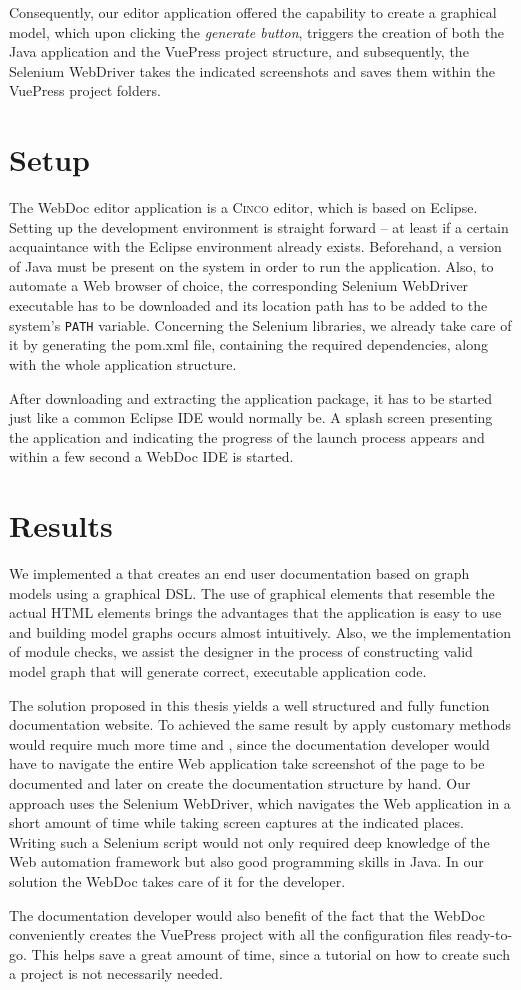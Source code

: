 Consequently, our editor application offered the capability to create a graphical model, which upon clicking the \textit{generate button}, triggers the creation of both the Java application and the VuePress project structure, and subsequently, the Selenium WebDriver takes the indicated screenshots and saves them within the VuePress project folders.

\section{Setup}\label{sec:setup}

The WebDoc editor application is a \textsc{Cinco} editor, which is based on Eclipse. Setting up the development environment is straight forward -- at least if a certain acquaintance with the Eclipse environment already exists. Beforehand, a version of Java must be present on the system in order to run the application. Also, to automate a Web browser of choice, the corresponding Selenium WebDriver executable has to be downloaded and its location path has to be added to the system's \lstinline{PATH} variable. Concerning the Selenium libraries, we already take care of it by generating the pom.xml file, containing the required dependencies, along with the whole application structure.

After downloading and extracting the application package, it has to be started just like a common Eclipse IDE would normally be. A splash screen presenting the application and indicating the progress of the launch process appears and within a few second a WebDoc IDE is started. 

\section{Results}\label{sec:res}
We implemented a  that creates an end user documentation based on graph models using a graphical DSL. The use of graphical elements that resemble the actual HTML elements brings the advantages that the application is easy to use and building model graphs occurs almost intuitively. Also, we the implementation of module checks, we assist the designer in the process of constructing valid model graph that will generate correct, executable application code.

The solution proposed in this thesis yields a well structured and fully function documentation website. To achieved the same result by apply customary methods would require much more time and , since the documentation developer would have to navigate the entire Web application take screenshot of the page to be documented and later on create the documentation structure by hand. Our approach uses the Selenium WebDriver, which navigates the Web application in a short amount of time while taking screen captures at the indicated places. Writing such a Selenium script would not only required deep knowledge of the Web automation framework but also good programming skills in Java. In our solution the WebDoc takes care of it for the developer.

The documentation developer would also benefit of the fact that the WebDoc conveniently creates the VuePress project with all the configuration files ready-to-go. This helps save a great amount of time, since a tutorial on how to create such a project is not necessarily needed.